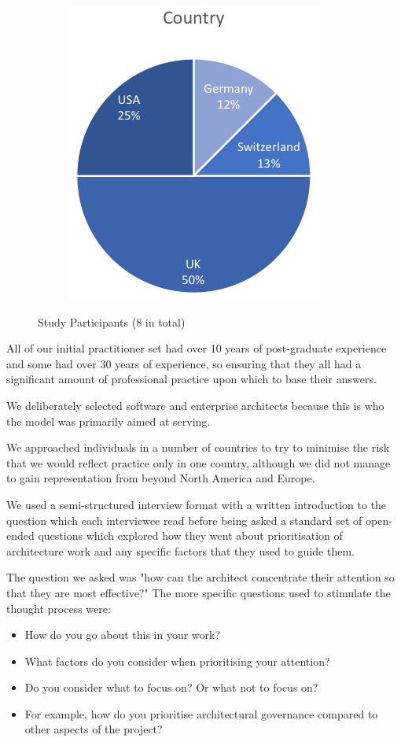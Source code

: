 \begin{figure}
\begin{subfigure}{\linewidth}
      \includegraphics[scale=1.0]{Figures/prioritisation-countries}
   \end{subfigure}

   \caption{Study Participants (8 in total)}
   \label{figure:participants}
\end{figure}  

All of our initial practitioner set had over 10 years of post-graduate experience and some had over 30 years of experience, so ensuring that they all had a significant amount of professional practice upon which to base their answers.

We deliberately selected software and enterprise architects because this is who the model was primarily aimed at serving.

We approached individuals in a number of countries to try to minimise the risk that we would reflect practice only in one country, although we did not manage to gain representation from beyond North America and Europe.

We used a semi-structured interview format with a written introduction to the question which each interviewee read before being asked a standard set of open-ended questions which explored how they went about prioritisation of architecture work and any specific factors that they used to guide them.  

The question we asked was "how can the architect concentrate their attention so that they are most effective?" The more specific questions used to stimulate the thought process were: 

\begin{itemize}
	\item How do you go about this in your work? 
	\item What factors do you consider when prioritising your attention? 
	\item Do you consider what to focus on?   Or what not to focus on? 
	\item For example, how do you prioritise architectural governance compared to other aspects of the project?
\end{itemize}

